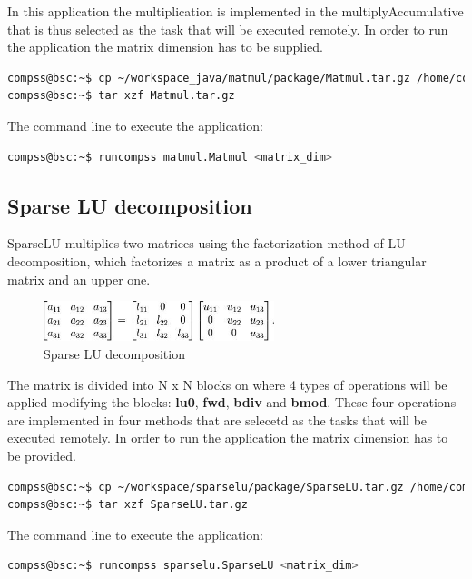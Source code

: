 In this application the multiplication is implemented in the multiplyAccumulative that is thus selected 
as the task that will be executed remotely. In order to run the application the matrix dimension has to 
be supplied.

\begin{lstlisting}[language=bash]
compss@bsc:~$ cp ~/workspace_java/matmul/package/Matmul.tar.gz /home/compss/
compss@bsc:~$ tar xzf Matmul.tar.gz
\end{lstlisting}

The command line to execute the application:

\begin{lstlisting}[language=bash]
compss@bsc:~$ runcompss matmul.Matmul <matrix_dim>
\end{lstlisting}


\subsection{Sparse LU decomposition}
SparseLU multiplies two matrices using the factorization method of LU decomposition, which factorizes a 
matrix as a product of a lower triangular matrix and an upper one.

\begin{figure}[ht!]
  \centering
    \includegraphics[width=0.6\textwidth]{./Sections/2_Java/Figures/SparseLU.jpeg}
    \caption{Sparse LU decomposition}
    \label{fig:SparseLO}
\end{figure}

The matrix is divided into N x N blocks on where 4 types of operations will be applied modifying the blocks: 
{\bf lu0}, {\bf fwd}, {\bf bdiv} and {\bf bmod}. These four operations are implemented in four methods that 
are selecetd as the tasks that will be executed remotely. In order to run the application the matrix dimension 
has to be provided.

\begin{lstlisting}[language=bash]
compss@bsc:~$ cp ~/workspace/sparselu/package/SparseLU.tar.gz /home/compss/
compss@bsc:~$ tar xzf SparseLU.tar.gz
\end{lstlisting}

The command line to execute the application:

\begin{lstlisting}[language=bash]
compss@bsc:~$ runcompss sparselu.SparseLU <matrix_dim>
\end{lstlisting}


